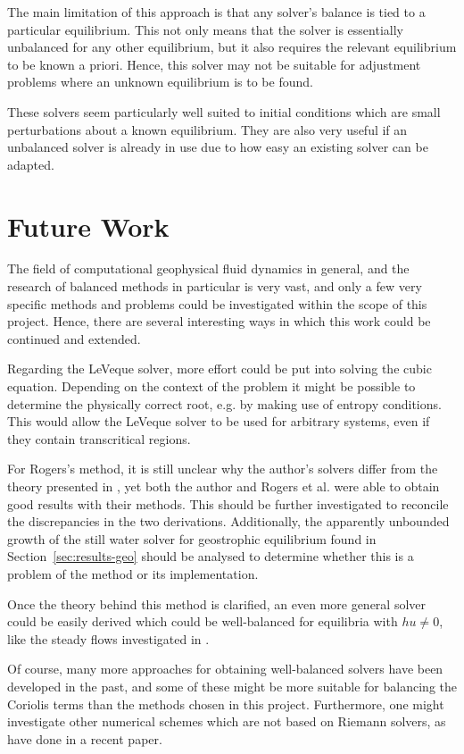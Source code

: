 The main limitation of this approach is that any solver's balance is tied to a particular equilibrium. This not only means that the solver is essentially unbalanced for any other equilibrium, but it also requires the relevant equilibrium to be known a priori. Hence, this solver may not be suitable for adjustment problems where an unknown equilibrium is to be found.

These solvers seem particularly well suited to initial conditions which are small perturbations about a known equilibrium. They are also very useful if an unbalanced solver is already in use due to how easy an existing solver can be adapted.

\section{Future Work}

The field of computational geophysical fluid dynamics in general, and the research of balanced methods in particular is very vast, and only a few very specific methods and problems could be investigated within the scope of this project. Hence, there are several interesting ways in which this work could be continued and extended.

Regarding the LeVeque solver, more effort could be put into solving the cubic equation. Depending on the context of the problem it might be possible to determine the physically correct root, e.g. by making use of entropy conditions. This would allow the LeVeque solver to be used for arbitrary systems, even if they contain transcritical regions.

For Rogers's method, it is still unclear why the author's solvers differ from the theory presented in \cite{rogers2003mathematical}, yet both the author and Rogers et al. were able to obtain good results with their methods. This should be further investigated to reconcile the discrepancies in the two derivations. Additionally, the apparently unbounded growth of the still water solver for geostrophic equilibrium found in Section~\ref{sec:results-geo} should be analysed to determine whether this is a problem of the method or its implementation.

Once the theory behind this method is clarified, an even more general solver could be easily derived which could be well-balanced for equilibria with $hu \neq 0$, like the steady flows investigated in \cite{esler2005steady}.

Of course, many more approaches for obtaining well-balanced solvers have been developed in the past, and some of these might be more suitable for balancing the Coriolis terms than the methods chosen in this project. Furthermore, one might investigate other numerical schemes which are not based on Riemann solvers, as \citet{chertockwell} have done in a recent paper.

